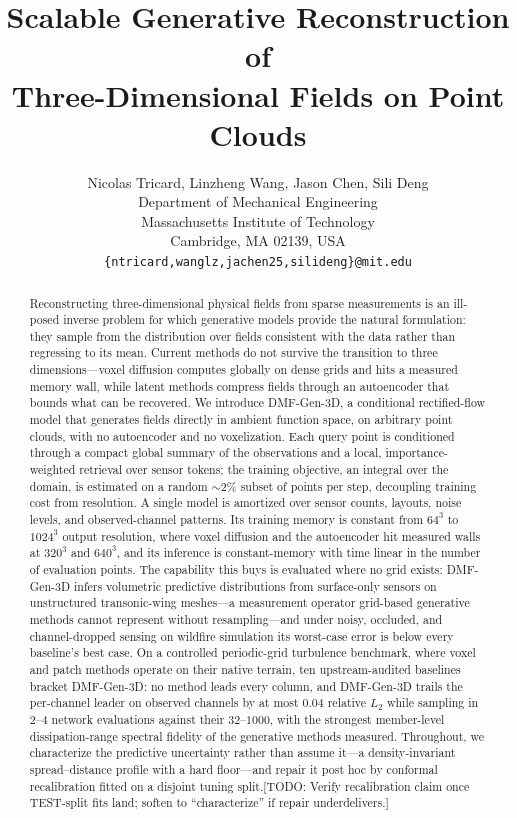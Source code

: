 \documentclass{article} %
\title{Scalable Generative Reconstruction of\\Three-Dimensional Fields on Point Clouds}
\author{Nicolas Tricard, Linzheng Wang, Jason Chen, Sili Deng \\
Department of Mechanical Engineering\\
Massachusetts Institute of Technology\\
Cambridge, MA 02139, USA \\
\texttt{\{ntricard,wanglz,jachen25,silideng\}@mit.edu} \\
}
\newcommand{\todo}[1]{{\color{red}[TODO: #1]}}
\newcommand{\model}{DMF-Gen-3D}
\begin{document}
\maketitle

\begin{abstract}
Reconstructing three-dimensional physical fields from sparse measurements is an ill-posed inverse problem for which generative models provide the natural formulation: they sample from the distribution over fields consistent with the data rather than regressing to its mean. Current methods do not survive the transition to three dimensions---voxel diffusion computes globally on dense grids and hits a measured memory wall, while latent methods compress fields through an autoencoder that bounds what can be recovered. We introduce \model{}, a conditional rectified-flow model that generates fields directly in ambient function space, on arbitrary point clouds, with no autoencoder and no voxelization. Each query point is conditioned through a compact global summary of the observations and a local, importance-weighted retrieval over sensor tokens; the training objective, an integral over the domain, is estimated on a random $\sim$2\% subset of points per step, decoupling training cost from resolution. A single model is amortized over sensor counts, layouts, noise levels, and observed-channel patterns. Its training memory is constant from $64^3$ to $1024^3$ output resolution, where voxel diffusion and the autoencoder hit measured walls at $320^3$ and $640^3$, and its inference is constant-memory with time linear in the number of evaluation points. The capability this buys is evaluated where no grid exists: \model{} infers volumetric predictive distributions from surface-only sensors on unstructured transonic-wing meshes---a measurement operator grid-based generative methods cannot represent without resampling---and under noisy, occluded, and channel-dropped sensing on wildfire simulation its worst-case error is below every baseline's best case. On a controlled periodic-grid turbulence benchmark, where voxel and patch methods operate on their native terrain, ten upstream-audited baselines bracket \model{}: no method leads every column, and \model{} trails the per-channel leader on observed channels by at most $0.04$ relative $L_2$ while sampling in $2$--$4$ network evaluations against their $32$--$1000$, with the strongest member-level dissipation-range spectral fidelity of the generative methods measured. Throughout, we characterize the predictive uncertainty rather than assume it---a density-invariant spread--distance profile with a hard floor---and repair it post hoc by conformal recalibration fitted on a disjoint tuning split.\todo{Verify recalibration claim once TEST-split fits land; soften to ``characterize'' if repair underdelivers.}
\end{abstract}
\end{document}
